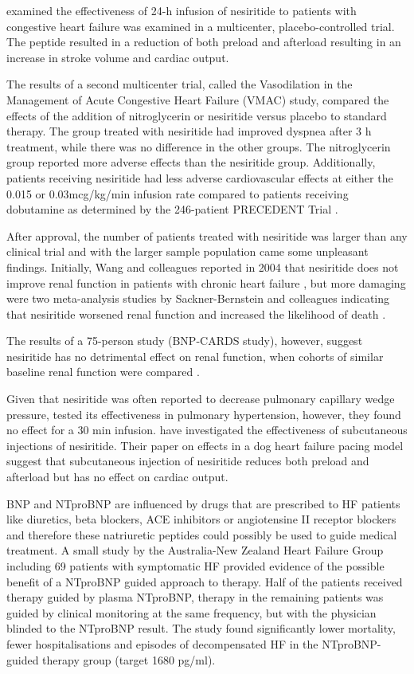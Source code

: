 \documentclass[14pt,a4paper,onecolumn]{extarticle}
\begin{document}
\citep{Mills1999} examined the effectiveness of 24-h infusion of nesiritide to patients with congestive heart failure was examined in a multicenter, placebo-controlled trial. The peptide resulted in a reduction of both preload and afterload resulting in an increase in stroke volume and cardiac output.

The results of a second multicenter trial, called the Vasodilation in the Management of Acute Congestive Heart Failure (VMAC) study, compared the effects of the addition of nitroglycerin or nesiritide versus placebo to standard therapy. The group treated with nesiritide had improved dyspnea after 3 h treatment, while there was no difference in the other groups. The nitroglycerin group reported more adverse effects than the nesiritide group. Additionally, patients receiving nesiritide had less adverse cardiovascular effects at either the 0.015 or 0.03mcg/kg/min infusion rate compared to patients receiving dobutamine as determined by the 246-patient PRECEDENT Trial \citep{deLissovoy2003}.

After approval, the number of patients treated with nesiritide was larger than any clinical trial and with the larger sample population came some unpleasant findings. Initially, Wang and colleagues reported in 2004 that nesiritide does not improve renal function in patients with chronic heart failure \citep{Wang2004a}, but more damaging were two meta-analysis studies by Sackner-Bernstein and colleagues indicating that nesiritide worsened renal function and increased the likelihood of death \citep{Sackner-Bernstein2005a} \citep{Sackner-Bernstein2005b}.

The results of a 75-person study (BNP-CARDS study), however, suggest nesiritide has no detrimental effect on renal function, when cohorts of similar baseline renal function were compared \citep{Witteles2007}.

Given that nesiritide was often reported to decrease pulmonary capillary wedge pressure, \citep{Michaels2005} tested its effectiveness in pulmonary hypertension, however, they found no effect for a 30 min infusion. \citep{Chen2006} have investigated the effectiveness of subcutaneous injections of nesiritide. Their paper on effects in a dog heart failure pacing model suggest that subcutaneous injection of nesiritide reduces both preload and afterload but has no effect on cardiac output.

BNP and NTproBNP are influenced by drugs that are prescribed to HF patients like diuretics, beta blockers, ACE inhibitors or angiotensine II receptor blockers and therefore these natriuretic peptides could possibly be used to guide medical treatment. A small study by the Australia-New Zealand Heart Failure Group including 69 patients with symptomatic HF provided evidence of the possible benefit of a NTproBNP guided approach to therapy. Half of the patients received therapy guided by plasma NTproBNP, therapy in the remaining patients was guided by clinical monitoring at the same frequency, but with the physician blinded to the NTproBNP result.  The study found significantly lower mortality, fewer hospitalisations and episodes of decompensated HF in the NTproBNP-guided therapy group (target 1680 pg/ml). \citep{Troughton2000}
\end{document}
